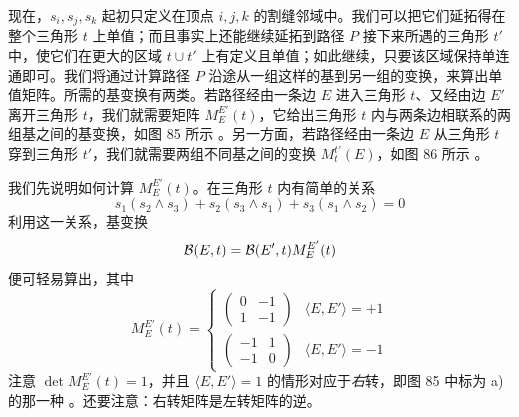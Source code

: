 现在，$s_i,s_j,s_k$ 起初只定义在顶点 $i,j,k$ 的割缝邻域中。我们可以把它们延拓得在整个三角形 $t$ 上单值；而且事实上还能继续延拓到路径 $P$ 接下来所遇的三角形 $t'$ 中，使它们在更大的区域 $t\cup t'$ 上有定义且单值；如此继续，只要该区域保持单连通即可。我们将通过计算路径 $P$ 沿途从一组这样的基到另一组的变换，来算出单值矩阵。所需的基变换有两类。若路径经由一条边 $E$ 进入三角形 $t$、又经由边 $E'$ 离开三角形 $t$，我们就需要矩阵 $M_E^{E'}(t)$，它给出三角形 $t$ 内与两条边相联系的两组基之间的基变换，如图 85 所示%
。另一方面，若路径经由一条边 $E$ 从三角形 $t$ 穿到三角形 $t'$，我们就需要两组不同基之间的变换 $M_t^{t'}(E)$，如图 86 所示%
。

我们先说明如何计算 $M_E^{E'}(t)$。在三角形 $t$ 内有简单的关系
\begin{equation}
s_1 (s_2 \wedge s_3) + s_2 (s_3 \wedge s_1)+ s_3 (s_1 \wedge s_2)=0
\end{equation}
利用这一关系，基变换
\begin{equation}
\mathcal{B}(E,t) = \mathcal{B}(E',t) M_{E}^{E'}(t)
\end{equation}
便可轻易算出，其中
\begin{equation}\label{eq:left-right-turn}
M_{E}^{E'}(t) = \begin{cases} \begin{pmatrix} 0 & -1 \\ 1 & -1 \end{pmatrix}&
\langle E,E'\rangle = +1 \\ \begin{pmatrix} -1 & 1 \\ -1 & 0 \end{pmatrix}&
\langle E,E'\rangle = -1 \end{cases}
\end{equation}
注意 $\det M_{E}^{E'}(t)=1$，并且 $\langle E,E'\rangle=1$ 的情形对应于\emph{右}转，即图 85 中标为 a) 的那一种%
。还要注意：右转矩阵是左转矩阵的逆。

